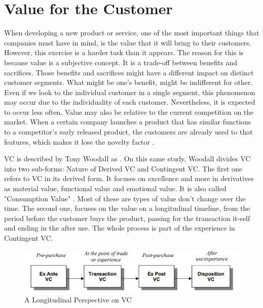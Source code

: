 \section{Value for the Customer}
When developing a new product or service, one of the most important things that companies must have in mind, is the value that it will bring to their customers. However, this exercise is a harder task than it appears. The reason for this is because value is a subjective concept. It is a trade-off between benefits and sacrifices. Those benefits and sacrifices might have a different impact on distinct customer segments. What might be one's benefit, might be indifferent for other. Even if we look to the individual customer in a single segment, this phenomenon may occur due to the individuality of each customer. Nevertheless, it is expected to occur less often. Value may also be relative to the current competition on the market. When a certain company launches a product that has similar functions to a competitor's early released product, the customers are already used to that features, which makes it lose the novelty factor \parencite{relationshipValueAndRelationshipQuality}.
\par
\gls{VC} is described by Tony Woodall as 
 \parencite{conceptualisingValueForTheCustomer}. On this same study, Woodall divides \gls{VC} into two sub-forms: Nature of Derived \gls{VC} and Contingent \gls{VC}. The first one refers to \gls{VC} in its derived form. It focuses on excellence and more in derivatives as material value, functional value and emotional value. It is also called "Consumption Value" \parencite{weAreWhatWeBuy}. Most of these are types of value don't change over the time. The second one, focuses on the value on a longitudinal timeline, from the period before the customer buys the product, passing for the transaction it-self and ending in the after use. The whole process is part of the experience in Contingent \gls{VC}. 
\par

\begin{figure}[htb]
\centering
\includegraphics[width=\textwidth,keepaspectratio]{chapters/Value_Analysis/assets/contigent-value-phases.png}
\caption[Longitudinal Perspective on \gls{VC}]{A Longitudinal Perspective on \gls{VC}\footnotemark}
\label{fig:longitudinalVC}
\end{figure}

